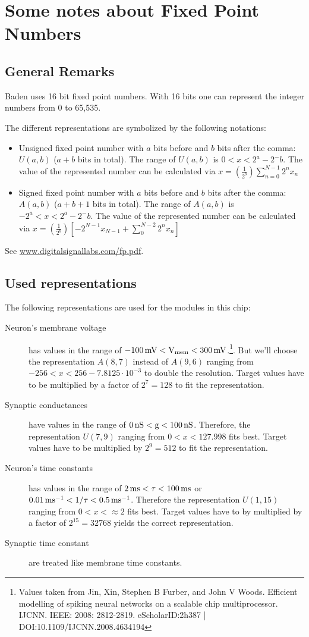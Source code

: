 \chapter{Some notes about Fixed Point Numbers}
\section{General Remarks}
Baden uses 16 bit fixed point numbers. With 16 bits one can represent the
integer numbers from 0 to 65,535.

The different representations are symbolized by the following notations:
\begin{itemize}
	\item Unsigned fixed point number with $a$ bits before and $b$ bits after the
	comma: $U(a,b)$ ($a+b$ bits in total). The range of $U(a,b)$ is $0 <
	x < 2^a-2^-b$. The value of the represented number can be calculated via $x =
	\left(\frac{1}{2^b}\right)\sum^{N-1}_{n=0} 2^n x_n$
	\item Signed fixed point number with $a$ bits before and $b$ bits after the
	comma: $A(a,b)$ ($a+b+1$ bits in total). The range of $A(a,b)$ is $-2^a <
	x < 2^a-2^-b$. The value of the represented number can be calculated
	via $x = \left(\frac{1}{2^b}\right)\left[-2^{N-1}x_{N-1}+\sum^{N-2}_{0}2^n
	x_n\right]$
\end{itemize}

See \url{www.digitalsignallabs.com/fp.pdf}.

\section{Used representations}
The following representations are used for the modules in this chip:
\begin{description}
	\item[Neuron's membrane voltage] has values in the range of $-100\rm\,mV <
		V_{mem} < 300\,mV$.\footnote{Values taken from Jin, Xin, Stephen B
		Furber, and John V Woods. Efficient modelling of spiking neural
		networks on a scalable chip multiprocessor. IJCNN. IEEE: 2008:
		2812-2819. eScholarID:2h387 | DOI:10.1109/IJCNN.2008.4634194}. But
		we'll choose the representation $A(8,7)$ instead of $A(9,6)$ ranging
		from $-256 < x < 256 - 7.8125\cdot 10^{-3}$ to double the resolution.
		Target values have to be multiplied by a factor of $2^7=128$ to fit the
		representation.
	\item[Synaptic conductances] have values in the range of $0\rm\,nS < g <
		100\,nS$. Therefore, the representation $U(7,9)$ ranging from $0 < x <
		127.998$ fits best. Target values have to be multiplied by $2^9 = 512$
		to fit the representation.
	\item[Neuron's time constants] has values in the range of $\rm2\,ms < \tau <
		100\,ms$ or $0.01\rm\,ms^{-1} < 1/\tau < 0.5\,ms^{-1}$. Therefore the
		representation $U(1,15)$ ranging from $0 < x < \approx 2$ fits best.
		Target values have to by multiplied by a factor of $2^{15} = 32768$
		yields the correct representation.
	\item[Synaptic time constant] are treated like membrane time constants.
\end{description}

